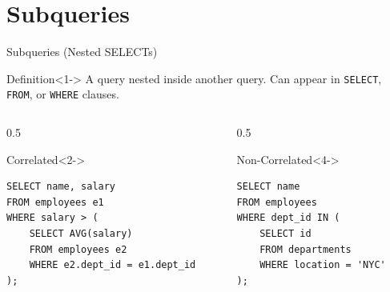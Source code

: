 \documentclass[aspectratio=169,11pt]{beamer}
\begin{document}
\section{Subqueries}
\begin{frame}[fragile]{Subqueries (Nested SELECTs)}
\begin{block}{Definition}<1->
A query nested inside another query. Can appear in \texttt{SELECT}, \texttt{FROM}, or \texttt{WHERE} clauses.
\end{block}

\pause
\begin{columns}[T]
\begin{column}{0.5\textwidth}
\begin{exampleblock}{Correlated}<2->
\begin{lstlisting}
SELECT name, salary
FROM employees e1
WHERE salary > (
    SELECT AVG(salary)
    FROM employees e2
    WHERE e2.dept_id = e1.dept_id
);
\end{lstlisting}
\end{exampleblock}
\end{column}
\pause
\begin{column}{0.5\textwidth}
\begin{exampleblock}{Non-Correlated}<4->
\begin{lstlisting}
SELECT name
FROM employees
WHERE dept_id IN (
    SELECT id
    FROM departments
    WHERE location = 'NYC'
);
\end{lstlisting}
\end{exampleblock}
\end{column}
\end{columns}
\end{frame}

\end{document}
